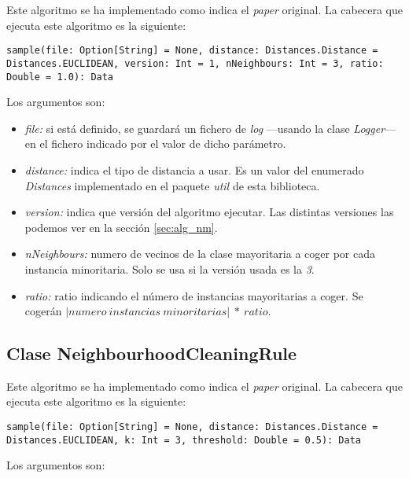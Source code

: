 Este algoritmo se ha implementado como indica el \textit{paper} original. La cabecera que ejecuta este algoritmo es la siguiente:

\begin{lstlisting}[frame=single, basicstyle=\scriptsize, breaklines=true]
sample(file: Option[String] = None, distance: Distances.Distance = Distances.EUCLIDEAN, version: Int = 1, nNeighbours: Int = 3, ratio: Double = 1.0): Data
\end{lstlisting}

Los argumentos son:

\begin{itemize}
    \item \textit{file:} si está definido, se guardará un fichero de \textit{log} —usando la clase \textit{Logger}— en el fichero indicado por el valor de dicho parámetro.
    \item \textit{distance:} indica el tipo de distancia a usar. Es un valor del enumerado \textit{Distances} implementado en el paquete \textit{util} de esta biblioteca.
    \item \textit{version:} indica que versión del algoritmo ejecutar. Las distintas versiones las podemos ver en la sección \ref{sec:alg_nm}.
    \item \textit{nNeighbours:} numero de vecinos de la clase mayoritaria a coger por cada instancia minoritaria. Solo se usa si la versión usada es la \textit{3}.
    \item \textit{ratio:} ratio indicando el número de instancias mayoritarias a coger. Se cogerán $\left | numero\ instancias\ minoritarias \right | \ *\ ratio$.
\end{itemize}

\subsection{Clase NeighbourhoodCleaningRule} \label{subsec:impl_neighbourhoodcleaningrule}

Este algoritmo se ha implementado como indica el \textit{paper} original. La cabecera que ejecuta este algoritmo es la siguiente:

\begin{lstlisting}[frame=single, basicstyle=\scriptsize, breaklines=true]
sample(file: Option[String] = None, distance: Distances.Distance = Distances.EUCLIDEAN, k: Int = 3, threshold: Double = 0.5): Data
\end{lstlisting}

Los argumentos son:

